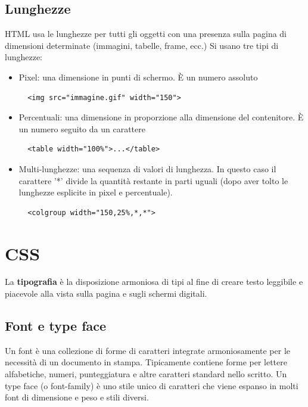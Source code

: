 \documentclass[a4paper,12pt]{article}
\begin{document}
\subsection*{Lunghezze}
HTML usa le lunghezze per tutti gli oggetti con una presenza sulla pagina di dimensioni determinate (immagini, tabelle, frame, ecc.) Si usano tre tipi di lunghezze:
\begin{itemize}
  \item Pixel: una dimensione in punti di schermo. È un numero assoluto
  \begin{lstlisting}
  <img src="immagine.gif" width="150">
  \end{lstlisting}
  \item Percentuali: una dimensione in proporzione alla dimensione del contenitore. È un numero seguito da un carattere %
  \begin{lstlisting}
  <table width="100%">...</table>
  \end{lstlisting}
  \item Multi-lunghezze: una sequenza di valori di lunghezza. In questo caso il carattere '*’ divide la quantità restante in parti uguali (dopo aver tolto le lunghezze esplicite in pixel e percentuale).
  \begin{lstlisting}
  <colgroup width="150,25%,*,*">
  \end{lstlisting}
\end{itemize}
\section{CSS}
La \textbf{tipografia} è la disposizione armoniosa di tipi al fine di creare testo leggibile e piacevole alla vista sulla pagina e sugli schermi digitali.
\subsection*{Font e type face}
Un font è una collezione di forme di caratteri integrate armoniosamente per le necessità di un documento in stampa. Tipicamente contiene forme per lettere alfabetiche, numeri, punteggiatura e altre caratteri standard nello scritto. Un type face (o font-family) è uno stile unico di caratteri che viene espanso in molti font di dimensione e peso e stili diversi.
\end{document}
